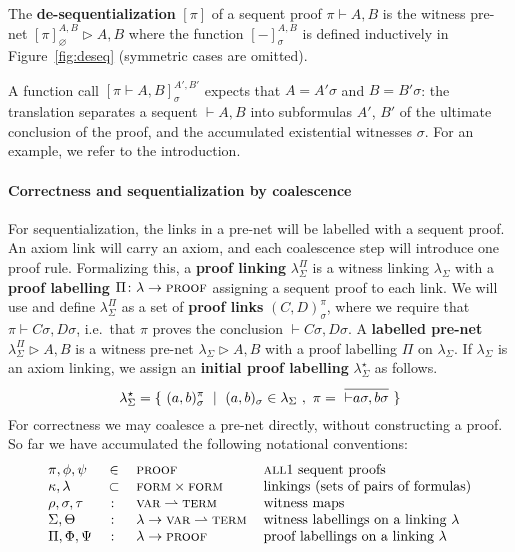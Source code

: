 \documentclass[a4paper,UKenglish]{lipics-v2019}
\newcommand\defn[1]{\textbf{#1}}
\newcommand\var{\textsc{var}}
\newcommand\terms{\textsc{term}}
\newcommand\form{\textsc{form}}
\newcommand\proofs{\textsc{proof}}
\newcommand\all{\textsc{all}}
\newcommand\+{+}
\renewcommand\*{\times}
\newcommand\seq[2]{{\vdash}#1,#2}
\newcommand\prf[3]{#1\vdash\!#2,#3}
\newcommand\net[3]{#1\triangleright #2,#3}
\newcommand\deseq[4][\sigma]{[#2]_{#1}^{#3,#4}}
\newcommand\link[3][\sigma]{(#2,#3)_{#1}}
\begin{document}
\begin{definition}
The \defn{de-sequentialization} $[\pi]$ of a sequent proof $\prf\pi AB$ is the witness pre-net $\net{\deseq[\varnothing]\pi AB}AB$ where the function $\deseq-AB$ is defined inductively in Figure~\ref{fig:deseq} (symmetric cases are omitted).
\end{definition}


A function call $\deseq{\prf\pi AB}{A'}{B'}$ expects that $A=A'\sigma$ and $B=B'\sigma$: the translation separates a sequent $\seq AB$ into subformulas $A'$, $B'$ of the ultimate conclusion of the proof, and the accumulated existential witnesses $\sigma$. For an example, we refer to the introduction.


\paragraph*{Correctness and sequentialization by coalescence}

For sequentialization, the links in a pre-net will be labelled with a sequent proof. An axiom link will carry an axiom, and each coalescence step will introduce one proof rule. Formalizing this, a \defn{proof linking} $\lambda_\Sigma^\Pi$ is a witness linking $\lambda_\Sigma$ with a \defn{proof labelling} $\Pi\colon \lambda\to\proofs$ assigning a sequent proof to each link. We will use and define $\lambda_\Sigma^\Pi$ as a set of \defn{proof links} $\link CD^\pi$, where we require that $\prf\pi{C\sigma}{D\sigma}$, i.e.\ that $\pi$ proves the conclusion $\seq{C\sigma}{D\sigma}$. A \defn{labelled pre-net} $\net{\lambda_\Sigma^\Pi}AB$ is a witness pre-net $\net{\lambda_\Sigma}AB$ with a proof labelling $\Pi$ on $\lambda_\Sigma$. If $\lambda_\Sigma$ is an axiom linking, we assign an \defn{initial proof labelling} $\lambda_\Sigma^\star$ as follows.
\[
	\lambda_\Sigma^\star = \{~\link ab^\pi~\mid~\link ab\in\lambda_\Sigma~,~\pi=~\infer{\seq{a\sigma}{b\sigma}}{}~\}
\]
For correctness we may coalesce a pre-net directly, without constructing a proof. 
%
So far we have accumulated the following notational conventions:
%
\[
\begin{tabular}{@{}lcll@{}}
	$\pi,\phi,\psi$		& $\in$ & $\proofs$ & \all1 sequent proofs\\
	$\kappa,\lambda$ 	& $\subset$ & $\form\times\form$ 	& linkings (sets of pairs of formulas)\\
	$\rho,\sigma,\tau$	& $\colon$  & $\var\rightharpoonup\terms$ & witness maps\\
	$\Sigma,\Theta$		& $\colon$  & $\lambda\to\var\rightharpoonup\terms$		& witness labellings on a linking $\lambda$ \\
	$\Pi,\Phi,\Psi$		& $\colon$  & $\lambda\to\proofs$		& proof labellings on a linking $\lambda$
\end{tabular}
\]
\end{document}
